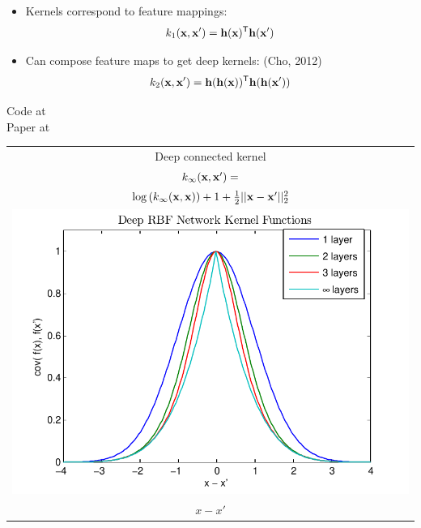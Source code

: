 \documentclass[portrait,a0b,final,a4resizeable]{include/a0poster}
\newcommand{\feat}{\vh}
\begin{document}
\begin{poster}
\begin{multicols}{2}
\vspace*{-1cm}
\begin{minipage}[c]{0.6\columnwidth}
\begin{itemize}
\item Kernels correspond to feature mappings:
$${k_1(\vx, \vx') = \feat(\vx) \tra \feat(\vx')}$$
\item Can compose feature maps to get deep kernels: {\color{mydarkblue} (Cho, 2012) }
$${k_2(\vx, \vx') = \feat(\feat(\vx)) \tra \feat(\feat(\vx'))}$$

\end{itemize}

Code at {}\\
Paper at {}

\end{minipage}
\begin{minipage}[c]{0.39\columnwidth}
\begin{centering}
\begin{tabular}{c}
Deep connected kernel \\
$k_\infty(\mathbf{x}, \mathbf{x}') = $ \\ $\log \left(k_\infty(\mathbf{x}, \mathbf{x}) \right) + 1 + \frac{1}{2} || \mathbf{x} - \mathbf{x}' ||_2^2$ \\[0.5cm]
\hspace{-0.5cm}\includegraphics[width=\columnwidth, clip, trim = 0cm 0.4cm 0.9cm 0.3cm]{../figures/deep_kernel_connected} \\
$x - x'$
\end{tabular}
\end{centering}
\end{minipage}

\end{multicols}
\end{poster}
\end{document}
